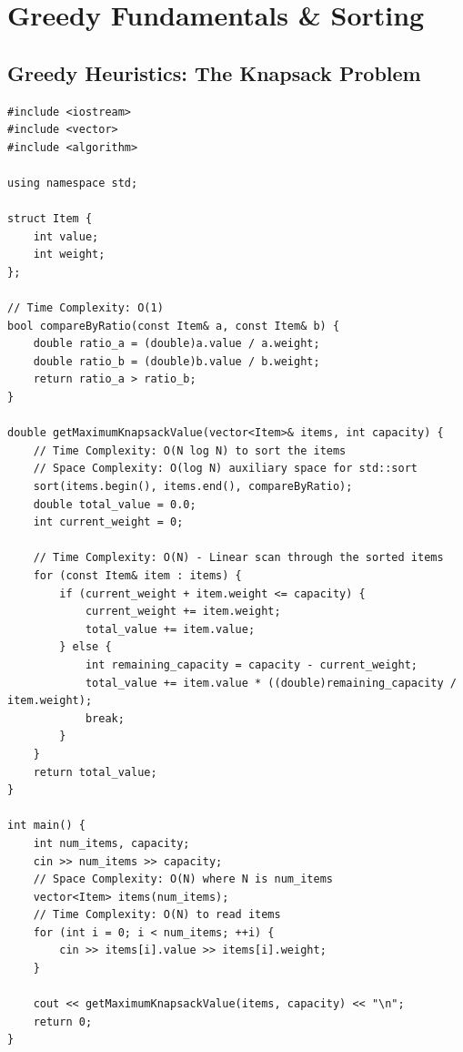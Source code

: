 \section{Greedy Fundamentals \& Sorting}

\subsection{Greedy Heuristics: The Knapsack Problem}
\begin{lstlisting}
#include <iostream>
#include <vector>
#include <algorithm>

using namespace std;

struct Item {
    int value;
    int weight;
};

// Time Complexity: O(1)
bool compareByRatio(const Item& a, const Item& b) {
    double ratio_a = (double)a.value / a.weight;
    double ratio_b = (double)b.value / b.weight;
    return ratio_a > ratio_b;
}

double getMaximumKnapsackValue(vector<Item>& items, int capacity) {
    // Time Complexity: O(N log N) to sort the items
    // Space Complexity: O(log N) auxiliary space for std::sort
    sort(items.begin(), items.end(), compareByRatio);
    double total_value = 0.0;
    int current_weight = 0;
    
    // Time Complexity: O(N) - Linear scan through the sorted items
    for (const Item& item : items) {
        if (current_weight + item.weight <= capacity) {
            current_weight += item.weight;
            total_value += item.value;
        } else {
            int remaining_capacity = capacity - current_weight;
            total_value += item.value * ((double)remaining_capacity / item.weight);
            break; 
        }
    }
    return total_value;
}

int main() {
    int num_items, capacity;
    cin >> num_items >> capacity;
    // Space Complexity: O(N) where N is num_items
    vector<Item> items(num_items);
    // Time Complexity: O(N) to read items
    for (int i = 0; i < num_items; ++i) {
        cin >> items[i].value >> items[i].weight;
    }
    
    cout << getMaximumKnapsackValue(items, capacity) << "\n";
    return 0;
}
\end{lstlisting}

